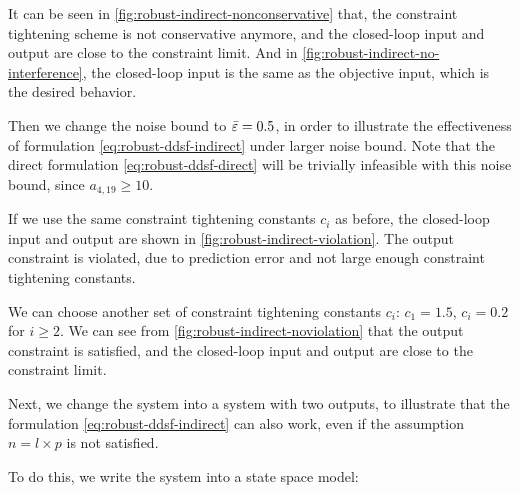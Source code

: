 

It can be seen in \cref{fig:robust-indirect-nonconservative} that, the constraint tightening scheme is not conservative anymore, and the closed-loop input and output are close to the constraint limit.
And in \cref{fig:robust-indirect-no-interference}, the closed-loop input is the same as the objective input, which is the desired behavior.

Then we change the noise bound to $\bar{\varepsilon} = 0.5$, in order to illustrate the effectiveness of formulation \cref{eq:robust-ddsf-indirect} under larger noise bound.
Note that the direct formulation \cref{eq:robust-ddsf-direct} will be trivially infeasible with this noise bound, since $a_{4, 19} \geq 10$.

If we use the same constraint tightening constants $c_i$ as before, the closed-loop input and output are shown in \cref{fig:robust-indirect-violation}.
The output constraint is violated, due to prediction error and not large enough constraint tightening constants.


We can choose another set of constraint tightening constants $c_i$: $c_1 = 1.5$, $c_i = 0.2$ for $i \geq 2$.
We can see from \cref{fig:robust-indirect-noviolation} that the output constraint is satisfied, and the closed-loop input and output are close to the constraint limit.


\newpage
Next, we change the system into a system with two outputs, to illustrate that the formulation \cref{eq:robust-ddsf-indirect} can also work, even if the assumption $n=l \times p$ is not satisfied.

To do this, we write the system into a state space model:

